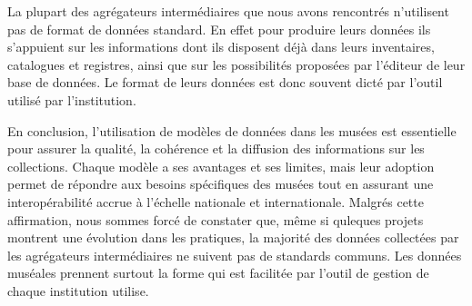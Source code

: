 La plupart des agrégateurs intermédiaires que nous avons rencontrés n’utilisent pas de format de données standard. En effet pour produire leurs données ils s’appuient sur les informations dont ils disposent déjà dans leurs inventaires, catalogues et registres, ainsi que sur les possibilités proposées par l’éditeur de leur base de données. Le format de leurs données est donc souvent dicté par l’outil utilisé par l’institution. \newline

En conclusion, l'utilisation de modèles de données dans les musées est essentielle pour assurer la qualité, la cohérence et la diffusion des informations sur les collections. Chaque modèle a ses avantages et ses limites, mais leur adoption permet de répondre aux besoins spécifiques des musées tout en assurant une interopérabilité accrue à l'échelle nationale et internationale. Malgrés cette affirmation, nous sommes forcé de constater que, même si quleques projets montrent une évolution dans les pratiques, la majorité des données collectées par les agrégateurs intermédiaires ne suivent pas de standards communs. Les données muséales prennent surtout la forme qui est facilitée par l'outil de gestion de chaque institution utilise. 

